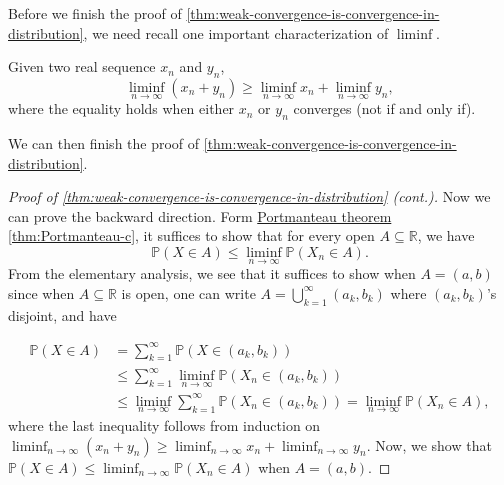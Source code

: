 Before we finish the proof of \autoref{thm:weak-convergence-is-convergence-in-distribution}, we need recall one important characterization of \(\liminf\).

\begin{prev}
	Given two real sequence \(x_n\) and \(y_n\),
	\[
		\liminf_{n \to \infty} (x_n + y_n) \geq \liminf_{n \to \infty} x_n + \liminf_{n \to \infty} y_n,
	\]
	where the equality holds when either \(x_n\) or \(y_n\) converges (not if and only if).
\end{prev}

We can then finish the proof of \autoref{thm:weak-convergence-is-convergence-in-distribution}.

\begin{proof}[Proof of \autoref{thm:weak-convergence-is-convergence-in-distribution} (cont.)]\label{pf:thm:weak-convergence-is-convergence-in-distribution}
	Now we can prove the backward direction. Form \hyperref[thm:Portmanteau]{Portmanteau theorem} \autoref{thm:Portmanteau-c}, it suffices to show that for every open \(A \subseteq \mathbb{R} \), we have
	\[
		\mathbb{P} (X \in A) \leq \liminf_{n \to \infty} \mathbb{P} (X_n \in A).
	\]
	From the elementary analysis, we see that it suffices to show when \(A = (a, b)\) since when \(A \subseteq \mathbb{R} \) is open, one can write \(A = \bigcup_{k=1}^{\infty} (a_k, b_k)\) where \((a_k, b_k)\)'s disjoint, and have

	\begin{align*}
		\mathbb{P} (X \in A)
		 & = \sum_{k=1}^{\infty} \mathbb{P} (X \in (a_k, b_k))                                                              \\
		 & \leq \sum_{k=1}^{\infty} \liminf_{n \to \infty} \mathbb{P} (X_n \in (a_k, b_k)) \tag*{assume true for intervals} \\
		 & \leq \liminf_{n \to \infty} \sum_{k=1}^{\infty} \mathbb{P} (X_n \in (a_k, b_k))
		= \liminf_{n \to \infty} \mathbb{P} (X_n \in A),
	\end{align*}
	where the last inequality follows from induction on \(\liminf_{n \to \infty} (x_n + y_n) \geq \liminf_{n \to \infty} x_n + \liminf_{n \to \infty} y_n\). Now, we show that \(\mathbb{P} (X \in A) \leq \liminf_{n \to \infty} \mathbb{P} (X_n \in A)\) when \(A = (a, b)\).


\end{proof}
